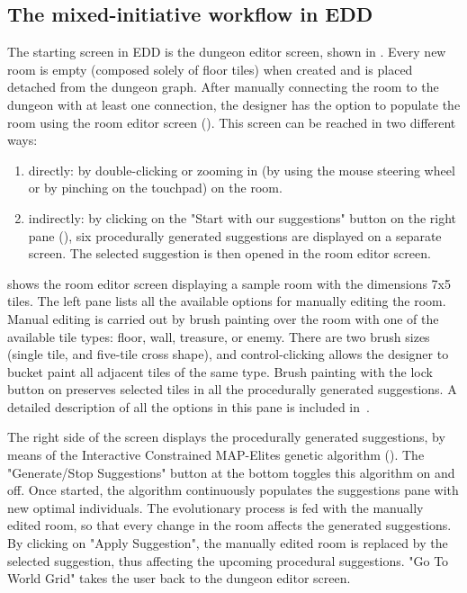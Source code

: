 \documentclass[conference]{IEEEtran}
\begin{document}
\subsection{The mixed-initiative workflow in EDD}

The starting screen in EDD is the dungeon editor screen, shown in . Every new room is empty (composed solely of floor tiles) when created and is placed detached from the dungeon graph. After manually connecting the room to the dungeon with at least one connection, the designer has the option to populate the room using the room editor screen (). This screen can be reached in two different ways:

\begin{enumerate}
\item directly: by double-clicking or zooming in (by using the mouse steering wheel or by pinching on the touchpad) on the room. 
\item indirectly: by clicking on the "Start with our suggestions" button on the right pane (), six procedurally generated suggestions are displayed on a separate screen. The selected suggestion is then opened in the room editor screen. 
\end{enumerate}

 shows the room editor screen displaying a sample room with the dimensions 7x5 tiles. The left pane lists all the available options for manually editing the room. Manual editing is carried out by brush painting over the room with one of the available tile types: floor, wall, treasure, or enemy. There are two brush sizes (single tile, and five-tile cross shape), and control-clicking allows the designer to bucket paint all adjacent tiles of the same type. Brush painting with the lock button on preserves selected tiles in all the procedurally generated suggestions. A detailed description of all the options in this pane is included in~\cite{Alvarez2018, Alvarez2018a}.

The right side of the screen displays the procedurally generated suggestions, by means of the Interactive Constrained MAP-Elites genetic algorithm (). The "Generate/Stop Suggestions" button at the bottom toggles this algorithm on and off. Once started, the algorithm continuously populates the suggestions pane with new optimal individuals. The evolutionary process is fed with the manually edited room, so that every change in the room affects the generated suggestions. By clicking on "Apply Suggestion", the manually edited room is replaced by the selected suggestion, thus affecting the upcoming procedural suggestions. "Go To World Grid" takes the user back to the dungeon editor screen.
\end{document}
